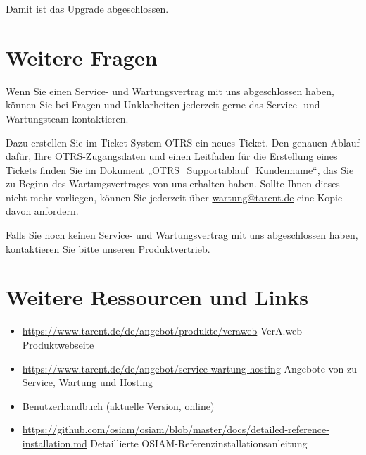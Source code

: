 \fi%

Damit ist das Upgrade abgeschlossen.

\section{Weitere Fragen}\label{sec:outro}

Wenn Sie einen Service- und Wartungsvertrag mit uns abgeschlossen
haben, können Sie bei Fragen und Unklarheiten jederzeit gerne das
Service- und Wartungsteam kontaktieren.

Dazu erstellen Sie im Ticket-System OTRS ein neues Ticket. Den
genauen Ablauf dafür, Ihre OTRS-Zugangsdaten und einen Leitfaden
für die Erstellung eines Tickets finden Sie im Dokument
„OTRS\_Supportablauf\_Kundenname“, das Sie zu Beginn des
Wartungsvertrages von uns erhalten haben. Sollte Ihnen dieses
nicht mehr vorliegen, können Sie jederzeit über
\href{mailto:wartung@tarent.de}{wartung@tarent.de} eine Kopie
davon anfordern.

Falls Sie noch keinen Service- und Wartungsvertrag mit uns abgeschlossen
haben, kontaktieren Sie bitte unseren Produktvertrieb.

\section{Weitere Ressourcen und Links}\label{sec:links}

\begin{itemize}
 \item{\href{https://www.tarent.de/de/angebot/produkte/veraweb}{https://www.tarent.de/de/angebot/produkte/veraweb}
  \dash VerA.web Produktwebseite}
 \item{\href{https://www.tarent.de/de/angebot/service-wartung-hosting}{https://www.tarent.de/de/angebot/service-wartung-hosting}
  \dash Angebote von  zu\\
  Service, Wartung und Hosting}
 \item{\href{https://evolvis.org/plugins/scmgit/cgi-bin/gitweb.cgi?p=veraweb/veraweb.git;a=blob_plain;f=src/main/webapp/doc/Benutzerhandbuch.pdf;hb=HEAD}{Benutzerhandbuch}
  (aktuelle Version, online)}
\ifoa
 \item{\href{https://github.com/osiam/osiam/blob/master/docs/detailed-reference-installation.md}{https://github.com/osiam/osiam/blob/master/docs/detailed-reference-installation.md}
  \dash Detaillierte OSIAM-Referenzinstallationsanleitung}
\fi%
\end{itemize}

